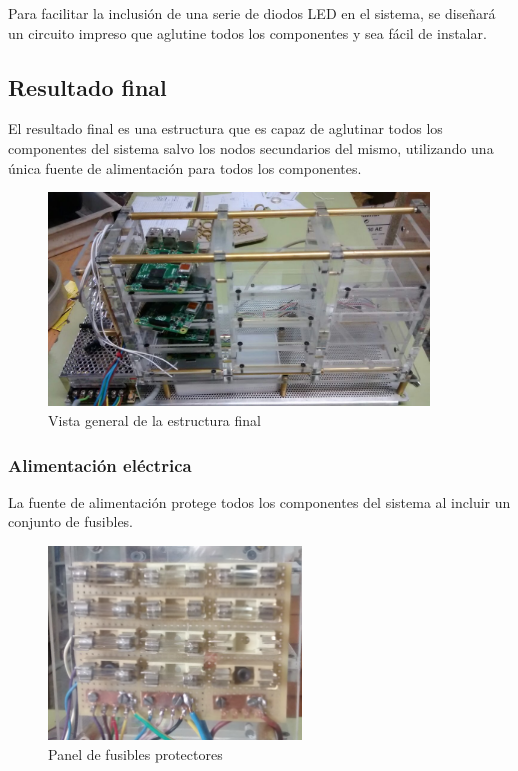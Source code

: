 Para facilitar la inclusión de una serie de diodos LED en el sistema, se diseñará un circuito impreso que aglutine todos los componentes y sea fácil de instalar.

\subsection{Resultado final}

El resultado final es una estructura que es capaz de aglutinar todos los componentes del sistema salvo los nodos secundarios del mismo, utilizando una única fuente de alimentación para todos los componentes.

\begin{figure}[H]
\centering
\includegraphics[width=0.9\textwidth]{Chapters/Chapter5/Figures/estructuraFinal/general}
\caption{Vista general de la estructura final}
\end{figure}

\subsubsection{Alimentación eléctrica}

La fuente de alimentación protege todos los componentes del sistema al incluir un conjunto de fusibles.
\begin{figure}[H]
	\centering
	\includegraphics[width=0.6\textwidth]{Chapters/Chapter5/Figures/fusibles}
	\caption{Panel de fusibles protectores}
\end{figure}

